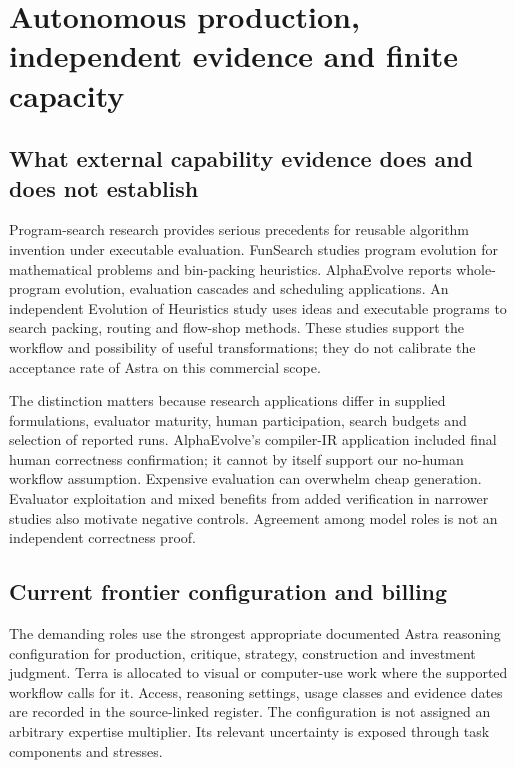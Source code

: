 \documentclass[11pt,a4paper]{article}
\begin{document}


\section{Autonomous production, independent evidence and finite capacity}

\subsection{What external capability evidence does and does not establish}

Program-search research provides serious precedents for reusable algorithm invention under executable evaluation. FunSearch studies program evolution for mathematical problems and bin-packing heuristics. AlphaEvolve reports whole-program evolution, evaluation cascades and scheduling applications. An independent Evolution of Heuristics study uses ideas and executable programs to search packing, routing and flow-shop methods. These studies support the workflow and possibility of useful transformations; they do not calibrate the acceptance rate of Astra on this commercial scope.\cite{FunSearch,AlphaEvolve,EoH}

The distinction matters because research applications differ in supplied formulations, evaluator maturity, human participation, search budgets and selection of reported runs. AlphaEvolve's compiler-IR application included final human correctness confirmation; it cannot by itself support our no-human workflow assumption. Expensive evaluation can overwhelm cheap generation. Evaluator exploitation and mixed benefits from added verification in narrower studies also motivate negative controls. Agreement among model roles is not an independent correctness proof.\cite{AlphaEvolve,Harness}

\subsection{Current frontier configuration and billing}

The demanding roles use the strongest appropriate documented Astra reasoning configuration for production, critique, strategy, construction and investment judgment. Terra is allocated to visual or computer-use work where the supported workflow calls for it. Access, reasoning settings, usage classes and evidence dates are recorded in the source-linked register. The configuration is not assigned an arbitrary expertise multiplier. Its relevant uncertainty is exposed through task components and stresses.\cite{OpenAIModels,OpenAIPrices}
\end{document}
